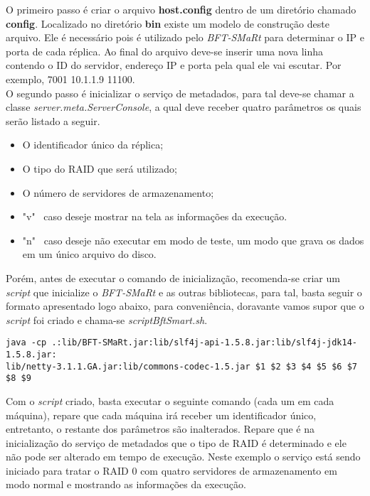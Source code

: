 O primeiro passo é criar o arquivo \textbf{host.config} dentro de um diretório chamado \textbf{config}. Localizado no diretório \textbf{bin} existe um modelo de construção deste arquivo. Ele é necessário pois é utilizado pelo \textit{BFT-SMaRt} para determinar o IP e porta de cada réplica. Ao final do arquivo deve-se inserir uma nova linha contendo o ID do servidor, endereço IP e porta pela qual ele vai escutar. Por exemplo, 7001 10.1.1.9 11100.
\\

O segundo passo é inicializar o serviço de metadados, para tal deve-se chamar a classe \textit{server.meta.ServerConsole}, a qual deve receber quatro parâmetros os quais serão listado a seguir. 

\begin{itemize}
	\item O identificador único da réplica;
	\item O tipo do RAID que será utilizado;
	\item O número de servidores de armazenamento;
	\item "v" ~caso deseje mostrar na tela as informações da execução.
	\item "n" ~caso deseje não executar em modo de teste, um modo que grava os dados em um único arquivo do disco.
\end{itemize}

Porém, antes de executar o comando de inicialização, recomenda-se criar um \textit{script} que inicialize o \textit{BFT-SMaRt} e as outras bibliotecas, para tal, basta seguir o formato apresentado logo abaixo, para conveniência, doravante vamos supor que o \textit{script} foi criado e chama-se \textit{scriptBftSmart.sh}.

\begin{lstlisting}
java -cp .:lib/BFT-SMaRt.jar:lib/slf4j-api-1.5.8.jar:lib/slf4j-jdk14-1.5.8.jar:
lib/netty-3.1.1.GA.jar:lib/commons-codec-1.5.jar $1 $2 $3 $4 $5 $6 $7 $8 $9
\end{lstlisting}

Com o \textit{script} criado, basta executar o seguinte comando (cada um em cada máquina), repare que cada máquina irá receber um identificador único, entretanto, o restante dos parâmetros são inalterados. Repare que é na inicialização do serviço de metadados que o tipo de RAID é determinado e ele não pode ser alterado em tempo de execução. Neste exemplo o serviço está sendo iniciado para tratar o RAID 0 com quatro servidores de armazenamento em modo normal e mostrando as informações da execução.
\\

